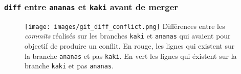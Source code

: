 \documentclass[table,tikz,12pt,svgnames]{beamer}
\begin{document}

\begin{frame}
\frametitle{\texttt{diff} entre \texttt{ananas} et \texttt{kaki} avant de merger}
\begin{adjustwidth}{-0.8cm}{-0.8cm}{}
	\begin{figure}
		\centering
		\texttt{[image: images/git\_diff\_conflict.png]}
		{Différences entre les \textit{commits} réalisés sur les branches \texttt{kaki} et \texttt{ananas} qui avaient pour objectif de produire un conflit. En {\color{red}rouge}, les lignes qui existent sur la branche \texttt{ananas} et pas \texttt{kaki}. En {\color{green}vert} les lignes qui éxistent sur la branche \texttt{kaki} et pas \texttt{ananas}.}
		\label{figure:example}
	\end{figure}
\end{adjustwidth}
\end{frame}

\end{document}

